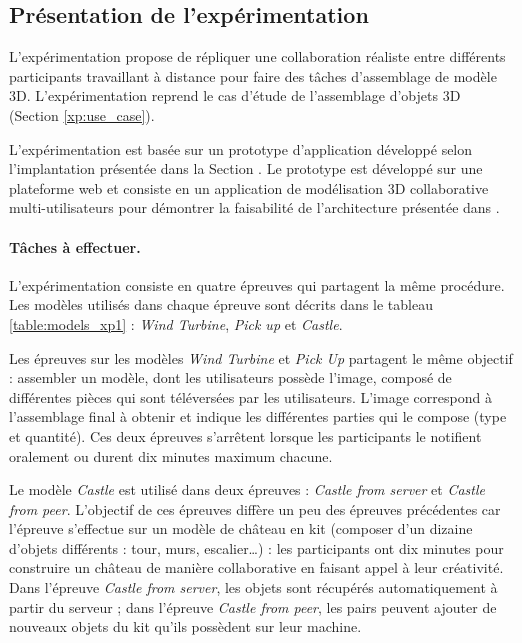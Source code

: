 
\subsection{Présentation de l'expérimentation}

L'expérimentation propose de répliquer une collaboration réaliste entre 
différents participants travaillant à distance pour faire des tâches d'assemblage de 
modèle 3D. L'expérimentation reprend le cas d'étude de l'assemblage d'objets 3D 
(Section \ref{xp:use_case}). 

L'expérimentation est basée sur un prototype d'application développé selon 
l'implantation présentée dans la Section .
Le prototype est développé sur une plateforme web et consiste en un application 
de modélisation 3D collaborative multi-utilisateurs pour démontrer la faisabilité de 
l'architecture présentée dans . 


\paragraph{Tâches à effectuer.}
L'expérimentation consiste en quatre épreuves qui partagent la même procédure.
Les modèles utilisés dans chaque épreuve sont décrits dans le tableau 
\ref{table:models_xp1} : \textit{Wind Turbine}, \textit{Pick up} et \textit{Castle}. 

Les épreuves sur les modèles \textit{Wind Turbine} et \textit{Pick Up} partagent le 
même objectif : 
assembler un modèle, dont les utilisateurs possède l'image, composé de 
différentes pièces qui sont téléversées par les utilisateurs. L'image correspond à 
l'assemblage final à obtenir et indique les différentes parties qui le 
compose (type et quantité). Ces deux épreuves s'arrêtent lorsque les participants 
le notifient oralement ou durent dix minutes maximum chacune.

Le modèle \textit{Castle} est utilisé dans deux épreuves : 
\textit{Castle from server} et \textit{Castle from peer}. L'objectif de ces épreuves
diffère un peu des épreuves précédentes car l'épreuve s'effectue sur un  modèle 
de château en kit (composer d'un dizaine d'objets différents : tour, murs, 
escalier\dots) : les 
participants ont dix minutes pour construire un 
château de manière collaborative en faisant appel à leur créativité. 
Dans l'épreuve \textit{Castle from server}, les objets sont récupérés 
automatiquement à partir du serveur ; 
dans l'épreuve \textit{Castle from peer}, les pairs peuvent ajouter de nouveaux 
objets du kit qu'ils possèdent sur leur machine.

